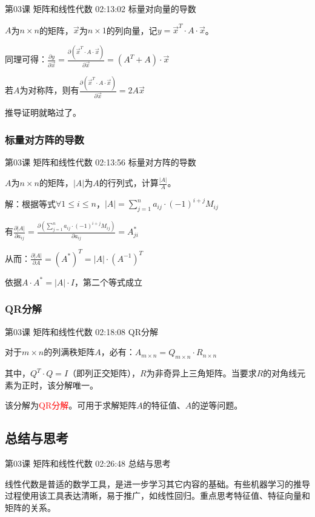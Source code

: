 \documentclass[UTF8]{ctexbook}
\begin{document}
第03课 矩阵和线性代数 02:13:02 标量对向量的导数

$A$为$n \times n$的矩阵，$\vec{x}$为$n \times 1$的列向量，记$y=\vec{x}^{T} \cdot A \cdot \vec{x}$。

同理可得：$\frac{\partial y}{\partial \vec{x}}
=\frac{\partial (\vec{x}^{T} \cdot A \cdot \vec{x})}{\partial \vec{x}}
=(A^{T}+A) \cdot \vec{x}$

若$A$为对称阵，则有$\frac{\partial (\vec{x}^{T} \cdot A \cdot \vec{x})}{\partial \vec{x}}=2A\vec{x}$

推导证明就略过了。

\subsubsection{标量对方阵的导数}

第03课 矩阵和线性代数 02:13:56 标量对方阵的导数

$A$为$n \times n$的矩阵，$|A|$为$A$的行列式，计算$\frac{|A|}{A}$。

解：根据等式$\forall 1 \leq i \leq n$，$|A|=\sum_{j=1}^{n}a_{ij} \cdot (-1)^{i+j}M_{ij}$

有$\frac{\partial |A|}{\partial a_{ij}}=\frac{\partial (\sum_{j=1}^{n}a_{ij} \cdot (-1)^{i+j}M_{ij})}{\partial a_{ij}}=A_{ji}^{*}$

从而：$\frac{\partial |A|}{\partial A}=(A^{*})^{T}=|A| \cdot (A^{-1})^{T}$

依据$A \cdot A^{*} = |A| \cdot I$，第二个等式成立

\subsubsection{QR分解}

第03课 矩阵和线性代数 02:18:08 QR分解

对于$m \times n$的列满秩矩阵$A$，必有：$A_{m \times n}=Q_{m \times n} \cdot R_{n \times n}$

其中，$Q^{T} \cdot Q = I$（即列正交矩阵），$R$为非奇异上三角矩阵。当要求$R$的对角线元素为正时，该分解唯一。

该分解为\textcolor{red}{QR分解}。可用于求解矩阵$A$的特征值、$A$的逆等问题。

\subsection{总结与思考}

第03课 矩阵和线性代数 02:26:48 总结与思考

线性代数是普适的数学工具，是进一步学习其它内容的基础。有些机器学习的推导过程使用该工具表达清晰，易于推广，如线性回归。重点思考特征值、特征向量和矩阵的关系。
\end{document}
